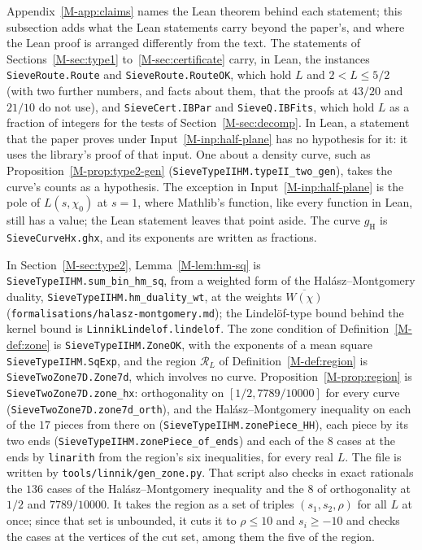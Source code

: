 \documentclass[11pt]{article}
\newcommand{\lean}[1]{\texttt{#1}}
\newcommand{\file}[1]{\nolinkurl{#1}}
\numberwithin{equation}{section}
\begin{document}
\begin{sloppypar}
Appendix~\ref{M-app:claims} names the Lean theorem behind each statement; this subsection adds what the Lean statements
carry beyond the paper's, and where the Lean proof is arranged differently from the text.
The statements of Sections~\ref{M-sec:type1} to~\ref{M-sec:certificate} carry, in Lean, the instances
\lean{SieveRoute.Route} and \lean{SieveRoute.RouteOK}, which hold $L$ and $2 < L \le 5/2$ (with two further numbers,
and facts about them, that the proofs at $43/20$ and $21/10$ do not use), and
\lean{SieveCert.IBPar} and \lean{SieveQ.IBFits}, which hold $L$ as a
fraction
of integers for the tests of Section~\ref{M-sec:decomp}. In Lean, a statement that the paper proves under
Input~\ref{M-inp:half-plane} has no hypothesis for it: it uses the library's proof of that input. One about a density
curve, such as Proposition~\ref{M-prop:type2-gen} (\lean{SieveTypeIIHM.typeII\_two\_gen}), takes the curve's counts as
a hypothesis. The exception in
Input~\ref{M-inp:half-plane} is the pole of $L(s, \chi_0)$ at $s = 1$, where Mathlib's function, like every function in
Lean, still has a value; the Lean statement leaves that point aside. The curve $g_{\mathrm H}$ is
\lean{SieveCurveHx.ghx}, and its exponents are written as fractions.

In Section~\ref{M-sec:type2}, Lemma~\ref{M-lem:hm-sq} is \lean{SieveTypeIIHM.\allowbreak sum\_bin\_hm\_sq}, from a
weighted form of
the Hal\'asz--Montgomery duality, \lean{SieveTypeIIHM.\allowbreak hm\_duality\_wt}, at the weights $\overline{W(\chi)}$
(\file{formalisations/halasz-montgomery.md}); the Lindelöf-type bound behind the kernel bound is
\lean{LinnikLindelof.lindelof}. The zone condition of Definition~\ref{M-def:zone} is \lean{SieveTypeIIHM.ZoneOK}, with
the exponents of a mean square \lean{SieveTypeIIHM.SqExp}, and the region $\mathcal R_L$ of
Definition~\ref{M-def:region} is \lean{SieveTwoZone7D.Zone7d}, which involves no curve. Proposition~\ref{M-prop:region}
is
\lean{SieveTwoZone7D.\allowbreak zone\_hx}: orthogonality on $[1/2, 7789/10000]$ for every curve
(\lean{SieveTwoZone7D.zone7d\_orth}), and the Hal\'asz--Montgomery inequality on each of the $17$ pieces from there on
(\lean{SieveTypeIIHM.\allowbreak zonePiece\_HH}), each piece by its two ends
(\lean{SieveTypeIIHM.\allowbreak zonePiece\_of\_ends}) and each of
the $8$ cases at the ends by \lean{linarith} from the region's six inequalities, for every real $L$. The file is written
by \file{tools/linnik/gen\_zone.py}. That script also checks in exact rationals the $136$ cases of the
Hal\'asz--Montgomery inequality and the $8$ of orthogonality at $1/2$ and $7789/10000$. It takes the region as a set of
triples $(s_1, s_2, \rho)$ for all $L$ at once; since that set is unbounded, it cuts it to $\rho \le 10$ and $s_i \ge
-10$ and checks the cases at the vertices of the cut set, among them the five of the region.


\end{sloppypar}
\end{document}
